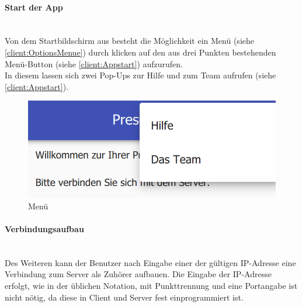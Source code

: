 \paragraph{Start der App}$\;$\\
Von dem Startbildschirm aus besteht die Möglichkeit ein Menü (siehe \autoref{client:OptionsMenue}) durch klicken auf den aus drei Punkten bestehenden Menü-Button (siehe \autoref{client:Appstart}) aufzurufen.
\\In diesem lassen sich zwei Pop-Ups zur Hilfe und zum Team aufrufen (siehe \autoref{client:Appstart}).
\begin{figure}[ht!]
	\centering
	\includegraphics[scale=0.5]{GUI/Bilder/Info_Menu.PNG}
	\caption{Menü{\tiny}}
	\label{client:OptionsMenue}
\end{figure}
\paragraph{Verbindungsaufbau}$\;$\\
Des Weiteren kann der Benutzer nach Eingabe einer der gültigen IP-Adresse eine Verbindung zum Server als Zuhörer aufbauen. Die Eingabe der IP-Adresse erfolgt, wie in der üblichen Notation, mit Punkttrennung und eine Portangabe ist nicht nötig, da diese in Client und Server fest einprogrammiert ist.

